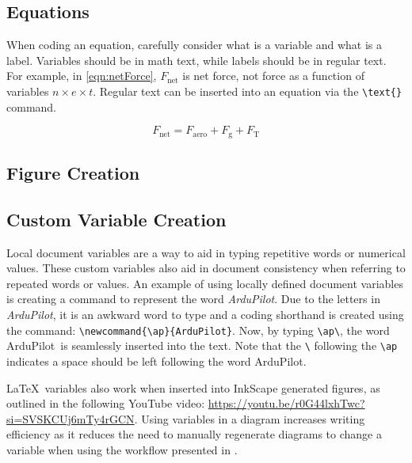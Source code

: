 \subsection{Equations}
When coding an equation, carefully consider what is a variable and what is a label. 
Variables should be in math text, while labels should be in regular text. 
For example, in \cref{eqn:netForce}, $F_{\text{net}}$ is net force, not force as a function of variables $n \times e \times t$. 
Regular text can be inserted into an equation via the \verb*|\text{}| command. 

\begin{equation} \label{eqn:netForce}
	F_{\text{net}} = F_{\text{aero}} + F_{\text{g}} + F_{\text{T}}
\end{equation}


\subsection{Figure Creation}
\subsection{Custom Variable Creation}
\newcommand{\ap}{ArduPilot}
Local document variables are a way to aid in typing repetitive words or numerical values. 
These custom variables also aid in document consistency when referring to repeated words or values. 
An example of using locally defined document variables is creating a command to represent the word \textit{ArduPilot}. 
Due to the letters in \textit{ArduPilot}, it is an awkward word to type and a coding shorthand is created using the command: \verb*|\newcommand{\ap}{ArduPilot}|. 
Now, by typing \verb*|\ap\|, the word \ap\ is seamlessly inserted into the text. 
Note that the \verb*|\| following the \verb*|\ap| indicates a space should be left following the word \ap.

\LaTeX\ variables also work when inserted into InkScape generated figures, as outlined in the following YouTube video: \url{https://youtu.be/r0G44lxhTwc?si=SVSKCUj6mTy4rGCN}. 
Using variables in a diagram increases writing efficiency as it reduces the need to manually regenerate diagrams to change a variable when using the workflow presented in . 